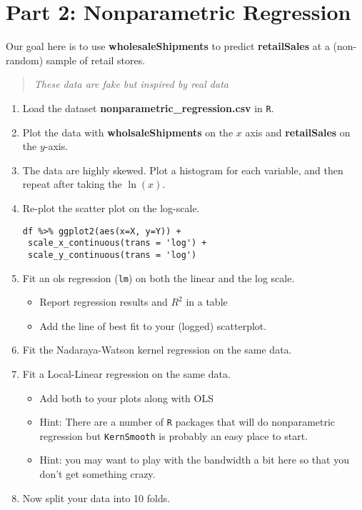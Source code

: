 \documentclass{article}
\begin{document}
\section*{Part 2: Nonparametric Regression}
Our goal here is to use \textbf{wholesaleShipments} to predict \textbf{retailSales} at a (non-random) sample of retail stores.
\begin{quote}
\textit{These data are fake but inspired by real data}
\end{quote}

\begin{enumerate}
\item Load the dataset \textbf{nonparametric\_regression.csv} in \texttt{R}.
\item Plot the data with \textbf{wholsaleShipments} on the $x$ axis and \textbf{retailSales} on the $y$-axis.
\item The data are highly skewed. Plot a histogram for each variable, and then repeat after taking the $\ln(x)$.
\item Re-plot the scatter plot on the log-scale. 
\begin{verbatim}
df %>% ggplot2(aes(x=X, y=Y)) +
 scale_x_continuous(trans = 'log') +
 scale_y_continuous(trans = 'log')
\end{verbatim}
\item Fit an ols regression (\texttt{lm}) on both the linear and the log scale.
\begin{itemize}
\item Report regression results and $R^2$ in a table
\item Add the line of best fit to your (logged) scatterplot.
\end{itemize}
\item Fit the Nadaraya-Watson kernel regression on the same data.
\item Fit a Local-Linear regression on the same data.
\begin{itemize}
\item Add both to your plots along with OLS
\item Hint: There are a number of \texttt{R} packages that will do nonparametric regression but \texttt{KernSmooth} is probably an easy place to start.
\item Hint: you may want to play with the bandwidth a bit here so that you don't get something crazy.
\end{itemize}
\item Now split your data into 10 folds.
\begin{verbatim}

\end{verbatim}
\end{enumerate}
\end{document}

